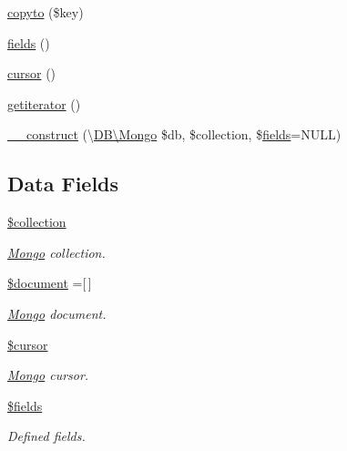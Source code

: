 \begin{DoxyCompactItemize}
\hyperlink{class_d_b_1_1_mongo_1_1_mapper_a4bcf54f913758fb093c35ea81fc29615}{copyto} (\$key)
\item 
\hyperlink{class_d_b_1_1_mongo_1_1_mapper_a9dfc1601eaf8348bed6ba5622f725971}{fields} ()
\item 
\hyperlink{class_d_b_1_1_mongo_1_1_mapper_aa3b267270ebe136571604fe35ce404fa}{cursor} ()
\item 
\hyperlink{class_d_b_1_1_mongo_1_1_mapper_a7f835c25df4cb49d02328644722656da}{getiterator} ()
\item 
\hyperlink{class_d_b_1_1_mongo_1_1_mapper_aebc412b4073d1b6a2439a70a2bbaac47}{\+\_\+\+\_\+construct} (\textbackslash{}\hyperlink{class_d_b_1_1_mongo}{D\+B\textbackslash{}\+Mongo} \$db, \$collection, \$\hyperlink{class_d_b_1_1_mongo_1_1_mapper_a9dfc1601eaf8348bed6ba5622f725971}{fields}=N\+U\+LL)
\end{DoxyCompactItemize}
\subsection*{Data Fields}
\begin{DoxyCompactItemize}
\item 
\hypertarget{class_d_b_1_1_mongo_1_1_mapper_ab9e21dbbe588414048003c715034e2aa}{}\label{class_d_b_1_1_mongo_1_1_mapper_ab9e21dbbe588414048003c715034e2aa} 
\hyperlink{class_d_b_1_1_mongo_1_1_mapper_ab9e21dbbe588414048003c715034e2aa}{\$collection}
\begin{DoxyCompactList}\small\item\em \hyperlink{class_d_b_1_1_mongo}{Mongo} collection. \end{DoxyCompactList}\item 
\hypertarget{class_d_b_1_1_mongo_1_1_mapper_ac5a31edb787609a3143dec9bfa8063ea}{}\label{class_d_b_1_1_mongo_1_1_mapper_ac5a31edb787609a3143dec9bfa8063ea} 
\hyperlink{class_d_b_1_1_mongo_1_1_mapper_ac5a31edb787609a3143dec9bfa8063ea}{\$document} =\mbox{[}$\,$\mbox{]}
\begin{DoxyCompactList}\small\item\em \hyperlink{class_d_b_1_1_mongo}{Mongo} document. \end{DoxyCompactList}\item 
\hypertarget{class_d_b_1_1_mongo_1_1_mapper_a256b6d58b346bcd39d5bf5d49de70df2}{}\label{class_d_b_1_1_mongo_1_1_mapper_a256b6d58b346bcd39d5bf5d49de70df2} 
\hyperlink{class_d_b_1_1_mongo_1_1_mapper_a256b6d58b346bcd39d5bf5d49de70df2}{\$cursor}
\begin{DoxyCompactList}\small\item\em \hyperlink{class_d_b_1_1_mongo}{Mongo} cursor. \end{DoxyCompactList}\item 
\hypertarget{class_d_b_1_1_mongo_1_1_mapper_ab2303c817e3b402b77b7f99627b9c319}{}\label{class_d_b_1_1_mongo_1_1_mapper_ab2303c817e3b402b77b7f99627b9c319} 
\hyperlink{class_d_b_1_1_mongo_1_1_mapper_ab2303c817e3b402b77b7f99627b9c319}{\$fields}
\begin{DoxyCompactList}\small\item\em Defined fields. \end{DoxyCompactList}\end{DoxyCompactItemize}
